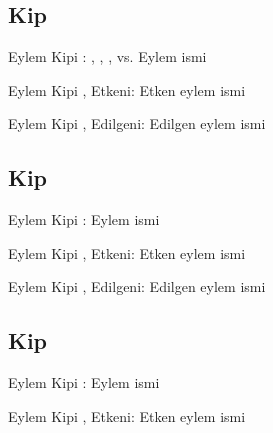 \subsection*{Kip }


\begin{eylemkipi}{Eylem Kipi : , , , vs.}
  Eylem ismi
\end{eylemkipi}

\begin{eylemkipi}{Eylem Kipi , Etkeni: }
  Etken eylem ismi
\end{eylemkipi}

\begin{eylemkipi}{Eylem Kipi , Edilgeni: }
  Edilgen eylem ismi
\end{eylemkipi}



\subsection*{Kip }

\begin{eylemkipi}{Eylem Kipi : }
  Eylem ismi
\end{eylemkipi}

\begin{eylemkipi}{Eylem Kipi , Etkeni: }
  Etken eylem ismi
\end{eylemkipi}

\begin{eylemkipi}{Eylem Kipi , Edilgeni: }
  Edilgen eylem ismi
\end{eylemkipi}


\subsection*{Kip }

\begin{eylemkipi}{Eylem Kipi : }
  Eylem ismi
\end{eylemkipi}

\begin{eylemkipi}{Eylem Kipi , Etkeni: }
  Etken eylem ismi
\end{eylemkipi}

